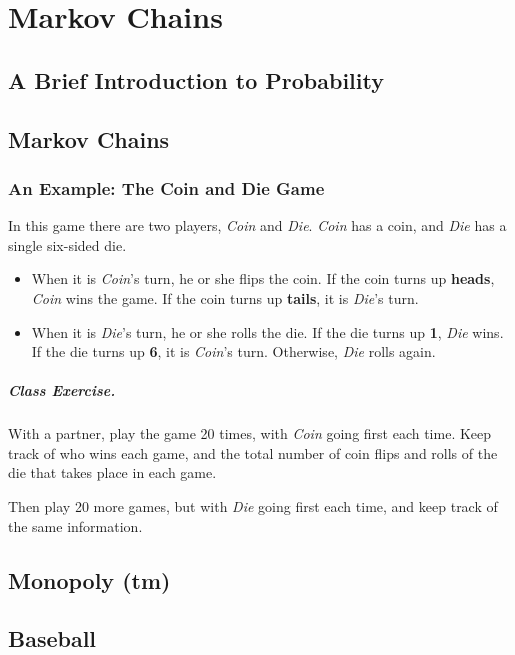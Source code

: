 \documentclass{book}
\begin{document}
\chapter{Markov Chains}
\section{A Brief Introduction to Probability}
\section{Markov Chains}
\subsection{An Example: The Coin and Die Game}

In this game there are two players, \emph{Coin}
and \emph{Die}. \emph{Coin} has a coin, and \emph{Die} has a
single six-sided die.

\begin{itemize}
\item
When it is \emph{Coin}'s turn, he or she flips the coin.
If the coin turns up \textbf{heads}, \emph{Coin} wins the game.
If the coin turns up \textbf{tails}, it is \emph{Die}'s turn.

\item
When it is \emph{Die}'s turn, he or she rolls the die.
If the die turns up \textbf{1}, \emph{Die} wins.
If the die turns up \textbf{6}, it is \emph{Coin}'s turn.
Otherwise, \emph{Die} rolls again.
\end{itemize}

\paragraph{Class Exercise.}
With a partner, play the game 20 times, with \emph{Coin}
going first each time.
Keep track of who wins each game, and the total
number of coin flips and rolls of the die
that takes place in each game.

Then play 20 more games, but with \emph{Die} going first
each time, and keep track of the same information.

\section{Monopoly (tm)}
\section{Baseball}
\end{document}
